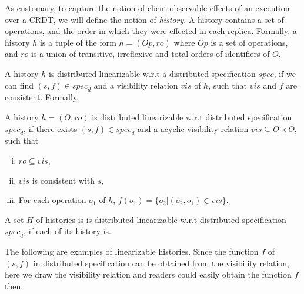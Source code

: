  As customary, to capture the notion of client-observable effects of an execution over a CRDT, we will define the notion of \emph{history}. A history contains a set of operations, and the order in which they were effected in each replica. Formally, a history $h$ is a tuple of the form $h = (Op,\mathit{ro})$ where $Op$ is a set of operations, and $\mathit{ro}$ is a union of transitive, irreflexive and total orders of identifiers of $O$. 


A history $h$ is distributed linearizable w.r.t a distributed specification $\mathit{spec}$, if we can find $(s,f) \in \mathit{spec}_d$ and a visibility relation $\mathit{vis}$ of $h$, such that $\mathit{vis}$ and $f$ are consistent. Formally, 

\begin{definition}
\label{definition:distributed linearizability}
A history $h = (O,\mathit{ro})$ is distributed linearizable w.r.t distributed specification $\mathit{spec}_d$, if there exists $(s,f) \in \mathit{spec}_d$ and a acyclic visibility relation $\mathit{vis} \subseteq O \times O$, such that 

\begin{enumerate}[(i)]
\item $\mathit{ro} \subseteq \mathit{vis}$,
\item $\mathit{vis}$ is consistent with $s$, 
\item For each operation $o_1$ of $h$, $f(o_1) = \{ o_2 \vert (o_2,o_1) \in \mathit{vis} \}$. 
\end{enumerate}

A set $H$ of histories is is distributed linearizable w.r.t distributed specification $\mathit{spec}_d$, if each of its history is.
\end{definition}



The following are examples of linearizable histories. Since the function $f$ of $(s,f)$ in distributed specification can be obtained from the visibility relation, here we draw the visibility relation and readers could easily obtain the function $f$ then. 

